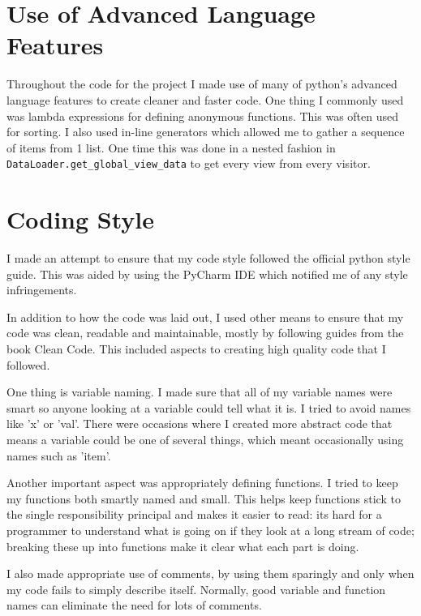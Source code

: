 \documentclass[12pt]{report}
\begin{document}
\section{Use of Advanced Language Features}
Throughout the code for the project I made use of many of python's advanced language features to create cleaner and faster code.  One thing I commonly used was lambda expressions for defining  anonymous functions.  This was often used for sorting.  I also used in-line generators which allowed me to gather a sequence of items from 1 list.  One time this was done in a nested fashion in \lstinline{DataLoader.get_global_view_data}\lstinline{} to get every view from every visitor.


\section{Coding Style}
I made an attempt to ensure that my code style followed the official python style guide\cite{_pep_????}.  This was aided by using the PyCharm IDE\cite{_pycharm_????} which notified me of any style infringements.

In addition to how the code was laid out, I used other means to ensure that my code was clean, readable and maintainable, mostly by following guides from the book Clean Code\cite{martin_clean_2008}.  This included aspects to creating high quality code that I followed.

One thing is variable naming.  I made sure that all of my variable names were smart so anyone looking at a variable could tell what it is.  I tried to avoid names like 'x' or 'val'.  There were occasions where I created more abstract code that means a variable could be one of several things, which meant occasionally using names such as 'item'.

Another important aspect was appropriately defining functions.  I tried to keep my functions both smartly named and small.  This helps keep functions stick to the single responsibility principal and makes it easier to read:  its hard for a programmer to understand what is going on if they look at a long stream of code; breaking these up into functions make it clear what each part is doing.

I also made appropriate use of comments, by using them sparingly and only when my code fails to simply describe itself.  Normally, good variable and function names can eliminate the need for lots of comments.
\end{document}

